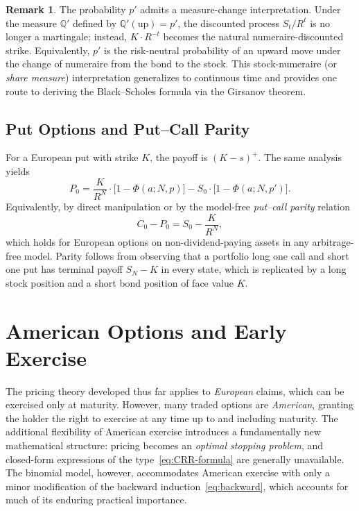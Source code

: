 \documentclass[11pt,a4paper]{article}
\theoremstyle{plain}
\theoremstyle{definition}
\newtheorem{remark}[theorem]{Remark}
\newcommand{\Q}{\mathbb{Q}}
\begin{document}
\begin{remark}
The probability $p'$ admits a measure-change interpretation. Under the
measure $\Q'$ defined by $\Q'(\text{up}) = p'$, the discounted process
$S_t / R^t$ is no longer a martingale; instead, $K \cdot R^{-t}$ becomes
the natural numeraire-discounted strike. Equivalently, $p'$ is the
risk-neutral probability of an upward move under the change of numeraire
from the bond to the stock. This stock-numeraire (or
\emph{share measure}) interpretation generalizes to continuous time and
provides one route to deriving the Black--Scholes formula via the
Girsanov theorem.
\end{remark}

\subsection{Put Options and Put--Call Parity}
\label{subsec:put-call}

For a European put with strike $K$, the payoff is $(K - s)^+$. The same
analysis yields
\begin{equation}
    \label{eq:put-formula}
    P_0 = \frac{K}{R^N} \cdot \bigl[1 - \Phi(a; N, p)\bigr]
        - S_0 \cdot \bigl[1 - \Phi(a; N, p')\bigr].
\end{equation}
Equivalently, by direct manipulation or by the model-free
\emph{put--call parity} relation
\begin{equation}
    \label{eq:put-call-parity}
    C_0 - P_0 = S_0 - \frac{K}{R^N},
\end{equation}
which holds for European options on non-dividend-paying assets in any
arbitrage-free model. Parity follows from observing that a portfolio long
one call and short one put has terminal payoff $S_N - K$ in every state,
which is replicated by a long stock position and a short bond position
of face value $K$.

\section{American Options and Early Exercise}
\label{sec:american}

The pricing theory developed thus far applies to \emph{European} claims,
which can be exercised only at maturity. However, many traded options are
\emph{American}, granting the holder the right to exercise at any time up
to and including maturity. The additional flexibility of American
exercise introduces a fundamentally new mathematical structure: pricing
becomes an \emph{optimal stopping problem}, and closed-form expressions
of the type~\eqref{eq:CRR-formula} are generally unavailable. The
binomial model, however, accommodates American exercise with only a
minor modification of the backward induction~\eqref{eq:backward}, which
accounts for much of its enduring practical importance.
\end{document}
